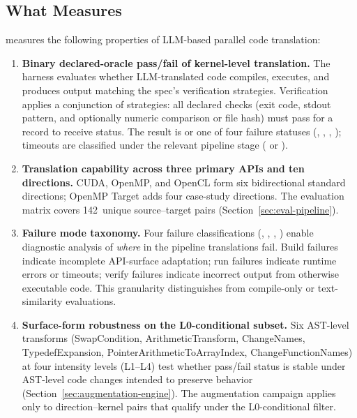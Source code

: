 \subsection{What \parbench{} Measures}
\label{sec:ec-measures}

\parbench{} measures the following properties of LLM-based parallel code
translation:
\begin{enumerate}
\item \textbf{Binary declared-oracle pass/fail of kernel-level translation.} 
    The harness evaluates whether LLM-translated code compiles, executes, and 
    produces output matching the spec's verification strategies. Verification 
    applies a conjunction of strategies: all declared checks (exit code, stdout 
    pattern, and optionally numeric comparison or file hash) must pass for a 
    record to receive \pass{} status. The result is \pass{} or one of four 
    failure statuses (\extractionfail{}, \buildfail{}, \runfail{}, 
    \verifyfail{}); timeouts are classified under the relevant pipeline stage 
    (\buildfail{} or \runfail{}).

  \item \textbf{Translation capability across three primary APIs and ten 
    directions.} CUDA, OpenMP, and OpenCL form six bidirectional standard 
    directions; OpenMP Target adds four case-study directions. The evaluation 
    matrix covers 142~unique source--target pairs 
    (Section~\ref{sec:eval-pipeline}).

  \item \textbf{Failure mode taxonomy.} Four failure classifications 
    (\extractionfail{}, \buildfail{}, \runfail{}, \verifyfail{}) enable 
    diagnostic analysis of \emph{where} in the pipeline translations fail. 
    Build failures indicate incomplete API-surface adaptation; run failures 
    indicate runtime errors or timeouts; verify failures indicate incorrect 
    output from otherwise executable code. This granularity distinguishes 
    \parbench{} from compile-only or text-similarity evaluations.

  \item \textbf{Surface-form robustness on the L0-conditional subset.} Six 
    AST-level transforms (SwapCondition, ArithmeticTransform, ChangeNames, 
    TypedefExpansion, PointerArithmeticToArrayIndex, ChangeFunctionNames) at 
    four intensity levels (L1--L4) test whether pass/fail status is stable 
    under AST-level code changes intended to preserve behavior 
    (Section~\ref{sec:augmentation-engine}). The augmentation campaign applies
    only to direction--kernel pairs that qualify under the L0-conditional
    filter.


\end{enumerate}
